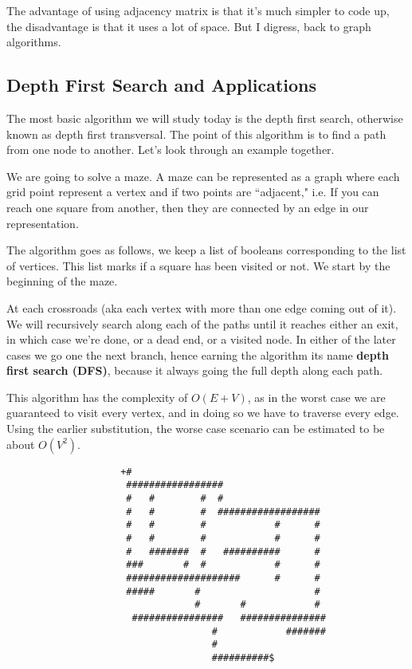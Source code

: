 \documentclass[12 pt, twoside] {article}
\begin{document}
{The advantage of using adjacency matrix is that it's much simpler to code up,
the disadvantage is that it uses a lot of space. But I digress, back to graph
algorithms.

\subsection*{Depth First Search and Applications}

The most basic algorithm we will study today is the depth first search,
otherwise known as depth first transversal. The point of this algorithm is to
find a path from one node to another. Let's look through an example together.

We are going to solve a maze. A maze can be represented as a graph where each
grid point represent a vertex and if two points are ``adjacent," i.e. If you can
reach one square from another, then they are connected by an edge in our
representation.

The algorithm goes as follows, we keep a list of booleans corresponding to the
list of vertices. This list marks if a square has been visited or not. We start
by the beginning of the maze.

At each crossroads (aka each vertex with more than one edge coming out of it).
We will recursively search along each of the paths until it reaches either an
exit, in which case we're done, or a dead end, or a visited node. In either of
the later cases we go one the next branch, hence earning the algorithm its name
\textbf{depth first search (DFS)}, because it always going the full depth along
each path.

This algorithm has the complexity of $O(E + V)$, as in the worst case we are
guaranteed to visit every vertex, and in doing so we have to traverse every
edge. Using the earlier substitution, the worse case scenario can be estimated
to be about $O(V^2)$.

\begin{verbatim}
                    +#                                        
                     #################                      
                     #   #        #  #                      
                     #   #        #  ##################     
                     #   #        #            #      #     
                     #   #        #            #      #     
                     #   #######  #   ##########      #     
                     ###       #  #            #      #     
                     ####################      #      #     
                     #####       #                    #     
                                 #       #            #     
                      ################   ###############    
                                    #            #######    
                                    #                       
                                    ##########$             
\end{verbatim}

}
\end{document}
